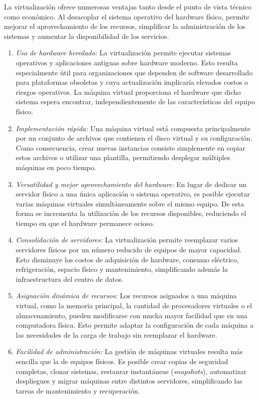 La virtualización ofrece numerosas ventajas tanto desde el punto de vista técnico como económico. Al desacoplar el sistema operativo del hardware físico, permite mejorar el aprovechamiento de los recursos, simplificar la administración de los sistemas y aumentar la disponibilidad de los servicios.
\begin{enumerate}
  \item \textit{Uso de hardware heredado:} La virtualización permite ejecutar sistemas operativos y aplicaciones antiguas sobre hardware moderno. Esto resulta especialmente útil para organizaciones que dependen de software desarrollado para plataformas obsoletas y cuya actualización implicaría elevados costos o riesgos operativos. La máquina virtual proporciona el hardware que dicho sistema espera encontrar, independientemente de las características del equipo físico.
  \item \textit{Implementación rápida:} Una máquina virtual está compuesta principalmente por un conjunto de archivos que contienen el disco virtual y su configuración. Como consecuencia, crear nuevas instancias consiste simplemente en copiar estos archivos o utilizar una plantilla, permitiendo desplegar múltiples máquinas en poco tiempo.
  \item \textit{Versatilidad y mejor aprovechamiento del hardware:} En lugar de dedicar un servidor físico a una única aplicación o sistema operativo, es posible ejecutar varias máquinas virtuales simultáneamente sobre el mismo equipo. De esta forma se incrementa la utilización de los recursos disponibles, reduciendo el tiempo en que el hardware permanece ocioso.
  \item \textit{Consolidación de servidores:} La virtualización permite reemplazar varios servidores físicos por un número reducido de equipos de mayor capacidad. Esto disminuye los costos de adquisición de hardware, consumo eléctrico, refrigeración, espacio físico y mantenimiento, simplificando además la infraestructura del centro de datos.
  \item \textit{Asignación dinámica de recursos:} Los recursos asignados a una máquina virtual, como la memoria principal, la cantidad de procesadores virtuales o el almacenamiento, pueden modificarse con mucha mayor facilidad que en una computadora física. Esto permite adaptar la configuración de cada máquina a las necesidades de la carga de trabajo sin reemplazar el hardware.
  \item \textit{Facilidad de administración:} La gestión de máquinas virtuales resulta más sencilla que la de equipos físicos. Es posible crear copias de seguridad completas, clonar sistemas, restaurar instantáneas (\textit{snapshots}), automatizar despliegues y migrar máquinas entre distintos servidores, simplificando las tareas de mantenimiento y recuperación.

\end{enumerate}
